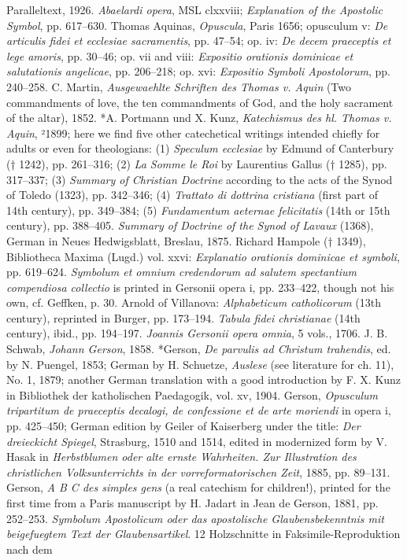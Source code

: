 Paralleltext, 1926. \emph{Abaelardi opera}, MSL clxxviii; \emph{Explanation of the Apostolic Symbol}, pp. 617–630. Thomas Aquinas, \emph{Opuscula}, Paris 1656; opusculum v: \emph{De articulis fidei et ecclesiae sacramentis}, pp. 47–54; op. iv: \emph{De decem praeceptis et lege amoris}, pp. 30–46; op. vii and viii: \emph{Expositio orationis dominicae et salutationis angelicae}, pp. 206–218; op. xvi: \emph{Expositio Symboli Apostolorum}, pp. 240–258. C. Martin, \emph{Ausgewaehlte Schriften des Thomas v. Aquin} (Two commandments of love, the ten commandments of God, and the holy sacrament of the altar), 1852. *A. Portmann und X. Kunz, \emph{Katechismus des hl. Thomas v. Aquin}, ²1899; here we find five other catechetical writings intended chiefly for adults or even for theologians: (1) \emph{Speculum ecclesiae} by Edmund of Canterbury († 1242), pp. 261–316; (2) \emph{La Somme le Roi} by Laurentius Gallus († 1285), pp. 317–337; (3) \emph{Summary of Christian Doctrine} according to the acts of the Synod of Toledo (1323), pp. 342–346; (4) \emph{Trattato di dottrina cristiana} (first part of 14th century), pp. 349–384; (5) \emph{Fundamentum aeternae felicitatis} (14th or 15th century), pp. 388–405. \emph{Summary of Doctrine of the Synod of Lavaux} (1368), German in Neues Hedwigsblatt, Breslau, 1875. Richard Hampole († 1349), Bibliotheca Maxima (Lugd.) vol. xxvi: \emph{Explanatio orationis dominicae et symboli}, pp. 619–624. \emph{Symbolum et omnium credendorum ad salutem spectantium compendiosa collectio} is printed in Gersonii opera i, pp. 233–422, though not his own, cf. Geffken, p. 30. Arnold of Villanova: \emph{Alphabeticum catholicorum} (13th century), reprinted in Burger, pp. 173–194. \emph{Tabula fidei christianae} (14th century), ibid., pp. 194–197. \emph{Joannis Gersonii opera omnia}, 5 vols., 1706. J. B. Schwab, \emph{Johann Gerson}, 1858. *Gerson, \emph{De parvulis ad Christum trahendis}, ed. by N. Puengel, 1853; German by H. Schuetze, \emph{Auslese} (see literature for ch. 11), No. 1, 1879; another German translation with a good introduction by F. X. Kunz in Bibliothek der katholischen Paedagogik, vol. xv, 1904. Gerson, \emph{Opusculum tripartitum de praeceptis decalogi, de confessione et de arte moriendi} in opera i, pp. 425–450; German edition by Geiler of Kaiserberg under the title: \emph{Der dreieckicht Spiegel}, Strasburg, 1510 and 1514, edited in modernized form by V. Hasak in \emph{Herbstblumen oder alte ernste Wahrheiten. Zur Illustration des christlichen Volksunterrichts in der vorreformatorischen Zeit}, 1885, pp. 89–131. Gerson, \emph{A B C des simples gens} (a real catechism for children!), printed for the first time from a Paris manuscript by H. Jadart in Jean de Gerson, 1881, pp. 252–253. \emph{Symbolum Apostolicum oder das apostolische Glaubensbekenntnis mit beigefuegtem Text der Glaubensartikel}. 12 Holzschnitte in Faksimile-Reproduktion nach dem
